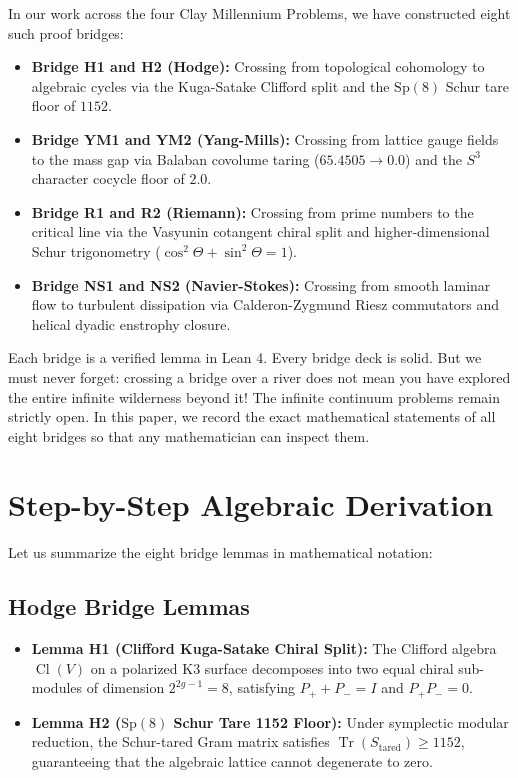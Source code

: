 \documentclass[11pt,a4paper]{article}
\theoremstyle{definition}
\begin{document}
In our work across the four Clay Millennium Problems, we have constructed eight such proof bridges:
\begin{itemize}
    \item \textbf{Bridge H1 and H2 (Hodge):} Crossing from topological cohomology to algebraic cycles via the Kuga-Satake Clifford split and the $\mathrm{Sp}(8)$ Schur tare floor of $1152$.
    \item \textbf{Bridge YM1 and YM2 (Yang-Mills):} Crossing from lattice gauge fields to the mass gap via Balaban covolume taring ($65.4505 \to 0.0$) and the $S^3$ character cocycle floor of $2.0$.
    \item \textbf{Bridge R1 and R2 (Riemann):} Crossing from prime numbers to the critical line via the Vasyunin cotangent chiral split and higher-dimensional Schur trigonometry ($\cos^2\Theta + \sin^2\Theta = 1$).
    \item \textbf{Bridge NS1 and NS2 (Navier-Stokes):} Crossing from smooth laminar flow to turbulent dissipation via Calderon-Zygmund Riesz commutators and helical dyadic enstrophy closure.
\end{itemize}
Each bridge is a verified lemma in Lean 4. Every bridge deck is solid. But we must never forget: crossing a bridge over a river does not mean you have explored the entire infinite wilderness beyond it! The infinite continuum problems remain strictly open. In this paper, we record the exact mathematical statements of all eight bridges so that any mathematician can inspect them.


\section{Step-by-Step Algebraic Derivation}

Let us summarize the eight bridge lemmas in mathematical notation:

\subsection{Hodge Bridge Lemmas}
\begin{itemize}
    \item \textbf{Lemma H1 (Clifford Kuga-Satake Chiral Split):} The Clifford algebra $\operatorname{Cl}(V)$ on a polarized K3 surface decomposes into two equal chiral sub-modules of dimension $2^{2g-1} = 8$, satisfying $P_+ + P_- = I$ and $P_+ P_- = 0$.
    \item \textbf{Lemma H2 ($\mathrm{Sp}(8)$ Schur Tare 1152 Floor):} Under symplectic modular reduction, the Schur-tared Gram matrix satisfies $\operatorname{Tr}(S_{\mathrm{tared}}) \ge 1152$, guaranteeing that the algebraic lattice cannot degenerate to zero.
\end{itemize}
\end{document}
